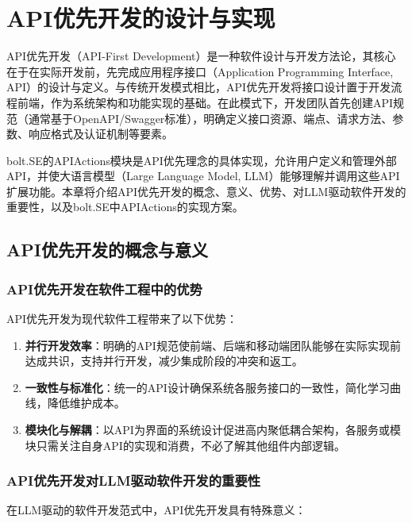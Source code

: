 
\chapter{API优先开发的设计与实现}
\label{chap:api-first}

API优先开发（API-First Development）是一种软件设计与开发方法论，其核心在于在实际开发前，先完成应用程序接口（Application Programming Interface, API）的设计与定义。与传统开发模式相比，API优先开发将接口设计置于开发流程前端，作为系统架构和功能实现的基础。在此模式下，开发团队首先创建API规范（通常基于OpenAPI/Swagger标准），明确定义接口资源、端点、请求方法、参数、响应格式及认证机制等要素。

bolt.SE的APIActions模块是API优先理念的具体实现，允许用户定义和管理外部API，并使大语言模型（Large Language Model, LLM）能够理解并调用这些API扩展功能。本章将介绍API优先开发的概念、意义、优势、对LLM驱动软件开发的重要性，以及bolt.SE中APIActions的实现方案。

\section{API优先开发的概念与意义}

\subsection{API优先开发在软件工程中的优势}
API优先开发为现代软件工程带来了以下优势：

\begin{enumerate}
  \item \textbf{并行开发效率}：明确的API规范使前端、后端和移动端团队能够在实际实现前达成共识，支持并行开发，减少集成阶段的冲突和返工。
  
  \item \textbf{一致性与标准化}：统一的API设计确保系统各服务接口的一致性，简化学习曲线，降低维护成本。
  
  \item \textbf{模块化与解耦}：以API为界面的系统设计促进高内聚低耦合架构，各服务或模块只需关注自身API的实现和消费，不必了解其他组件内部逻辑。
  
\end{enumerate}

\subsection{API优先开发对LLM驱动软件开发的重要性}
在LLM驱动的软件开发范式中，API优先开发具有特殊意义：

